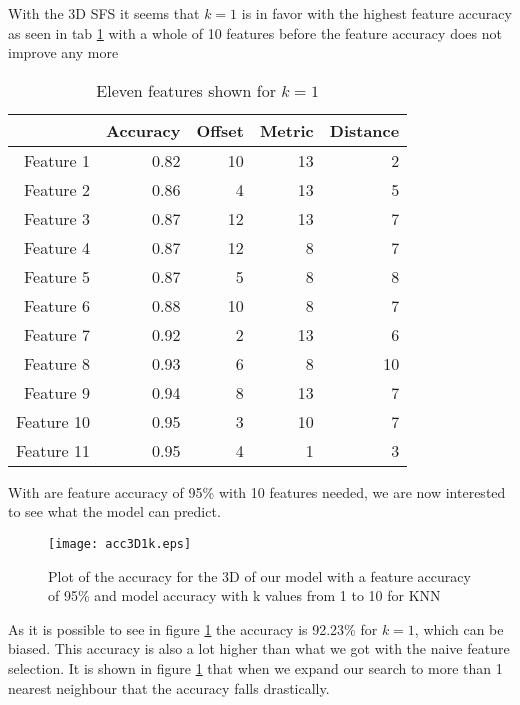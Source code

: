With the 3D SFS it seems that $k=1$ is in favor with the highest feature accuracy as seen in tab \ref{tab:Features3d1k} with a whole of 10 features before the feature accuracy does not improve any more

\begin{table}[H]
  \centering
    \begin{tabular}{|r|r|r|r|r|}
    \hline
          & Accuracy & Offset & Metric & Distance \\
    \hline
    Feature 1 & 0.82  & 10    & 13    & 2 \\
    \hline
    Feature 2 & 0.86  & 4     & 13    & 5 \\
    \hline
    Feature 3 & 0.87  & 12    & 13    & 7 \\
    \hline
    Feature 4 & 0.87  & 12    & 8     & 7 \\
    \hline
    Feature 5 & 0.87  & 5     & 8     & 8 \\
    \hline
    Feature 6 & 0.88  & 10    & 8     & 7 \\
    \hline
    Feature 7 & 0.92  & 2     & 13    & 6 \\
    \hline
    Feature 8 & 0.93  & 6     & 8     & 10 \\
    \hline
    Feature 9 & 0.94  & 8     & 13    & 7 \\
    \hline
    Feature 10 & 0.95  & 3     & 10    & 7 \\
    \hline
    Feature 11 & 0.95  & 4     & 1     & 3 \\
    \hline
    \end{tabular}%
  \caption{Eleven features shown for $k=1$}\label{tab:Features3d1k}%
\end{table}%

With are feature accuracy of 95\% with 10 features needed, we are now interested to see what the model can predict.

\begin{figure}[H]
  \centering
  \texttt{[image: acc3D1k.eps]}
  \caption{Plot of the accuracy for the 3D of our model with a feature accuracy of 95\% and model accuracy with k values from 1 to 10 for KNN}\label{fig:Features3d1k}
\end{figure}

As it is possible to see in figure \ref{fig:Features3d1k} the accuracy is 92.23\% for $k=1$, which can be biased. This accuracy is also a lot higher than what we got with the naive feature selection. It is shown in figure \ref{fig:Features3d1k} that when we expand our search to more than 1 nearest neighbour that the accuracy falls drastically.

